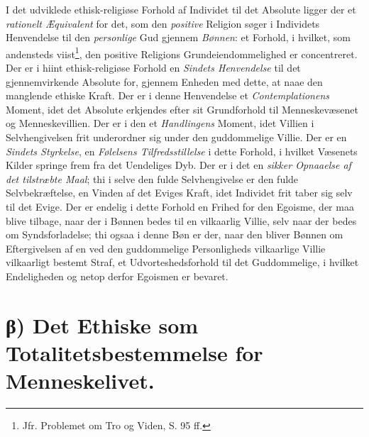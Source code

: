  \setcounter{footnote}{0}
I det udviklede ethisk-religiøse Forhold af Individet til det Absolute ligger der
et \emph{rationelt Æquivalent} for det, som den \emph{positive} Religion søger i
Individets Henvendelse til den \emph{personlige} Gud gjennem \emph{Bønnen}: et
Forhold, i hvilket, som andensteds viist\footnote{Jfr. Problemet om Tro og Viden,
S. 95 ff.}, den positive Religions Grundeiendommelighed er concentreret. Der er i
hiint ethisk-religiøse Forhold en \emph{Sindets Henvendelse} til det
gjennemvirkende Absolute for, gjennem Enheden med dette, at naae den manglende
ethiske Kraft. Der er i denne Henvendelse et \emph{Contemplationens} Moment, idet
det Absolute erkjendes efter sit Grundforhold til Menneskevæsenet og
Menneskevillien. Der er i den et \emph{Handlingens} Moment, idet Villien i
Selvhengivelsen frit underordner sig under den guddommelige Villie. Der er en
\emph{Sindets Styrkelse}, en \emph{Følelsens Tilfredsstillelse} i dette Forhold, i
hvilket Væsenets Kilder springe frem fra det Uendeliges Dyb. Der er i det en
\emph{sikker Opnaaelse af det tilstræbte Maal}; thi i selve den fulde
Selvhengivelse er den fulde Selvbekræftelse, en Vinden af det Eviges Kraft, idet
Individet frit taber sig selv til det Evige. Der er endelig i dette Forhold en
Frihed for den Egoisme, der maa blive tilbage, naar der i Bønnen bedes til en
vilkaarlig Villie, selv naar der bedes om Syndsforladelse; thi ogsaa i denne Bøn
er der, naar den bliver Bønnen om Eftergivelsen af en ved den guddommelige
Personligheds vilkaarlige Villie vilkaarligt bestemt Straf, et
Udvorteshedsforhold til det Guddommelige, i hvilket Endeligheden og netop derfor
Egoismen er bevaret.

\section*{β) Det Ethiske som Totalitetsbestemmelse for Menneskelivet.}

